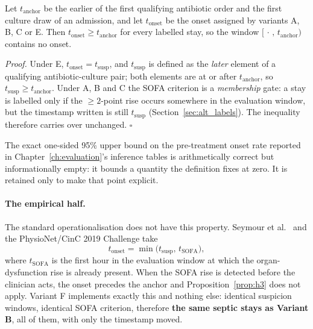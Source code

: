 \begin{mdframed}[backgroundcolor=ATUSand!20, linecolor=ATUGreen]
    \begin{proposition}\label{prop:h3}
    Let $t_{\mathrm{anchor}}$ be the earlier of the first qualifying antibiotic
    order and the first culture draw of an admission, and let
    $t_{\mathrm{onset}}$ be the onset assigned by variants A, B, C or E. Then
    $t_{\mathrm{onset}} \geq t_{\mathrm{anchor}}$ for every labelled stay, so the
    window $[\,\cdot\,,\, t_{\mathrm{anchor}})$ contains no onset.
    \end{proposition}

    \emph{Proof.} Under E, $t_{\mathrm{onset}} = t_{\mathrm{susp}}$, and
    $t_{\mathrm{susp}}$ is defined as the \emph{later} element of a qualifying
    antibiotic-culture pair; both elements are at or after
    $t_{\mathrm{anchor}}$, so $t_{\mathrm{susp}} \geq t_{\mathrm{anchor}}$.
    Under A, B and C the SOFA criterion is a \emph{membership} gate: a stay is
    labelled only if the $\geq 2$-point rise occurs somewhere in the evaluation
    window, but the timestamp written is still $t_{\mathrm{susp}}$
    (Section~\ref{sec:alt_labels}). The inequality therefore carries over
    unchanged. $\square$
\end{mdframed}

\noindent The exact one-sided 95\% upper bound on the pre-treatment onset rate
reported in Chapter~\ref{ch:evaluation}'s inference tables is arithmetically
correct but informationally empty: it bounds a quantity the definition fixes at
zero. It is retained only to make that point explicit.

\paragraph{The empirical half.}
The standard operationalisation does not have this property. Seymour et al.\ \cite{seymour2016assessment} and the PhysioNet/CinC 2019 Challenge
\cite{reyna2020utility} take
\[
    t_{\mathrm{onset}} = \min\bigl(t_{\mathrm{susp}},\, t_{\mathrm{SOFA}}\bigr),
\]
where $t_{\mathrm{SOFA}}$ is the first hour in the evaluation window at which
the organ-dysfunction rise is already present. When the SOFA rise is detected
before the clinician acts, the onset precedes the anchor and
Proposition~\ref{prop:h3} does not apply. Variant F implements exactly this and
nothing else: identical suspicion windows, identical SOFA criterion, therefore
\textbf{the same septic stays as Variant B}, all \pcFNOnsets{} of them,
with only the timestamp moved.

